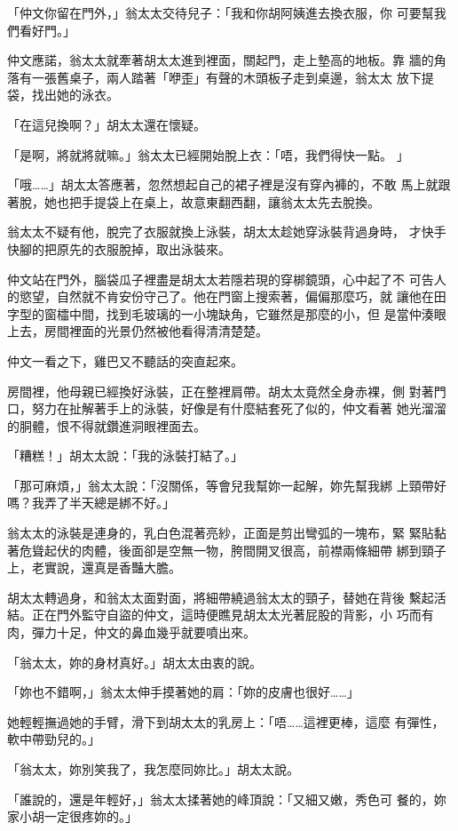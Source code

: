 「仲文你留在門外，」翁太太交待兒子：「我和你胡阿姨進去換衣服，你
可要幫我們看好門。」

仲文應諾，翁太太就牽著胡太太進到裡面，關起門，走上墊高的地板。靠
牆的角落有一張舊桌子，兩人踏著「咿歪」有聲的木頭板子走到桌邊，翁太太
放下提袋，找出她的泳衣。

「在這兒換啊？」胡太太還在懷疑。

「是啊，將就將就嘛。」翁太太已經開始脫上衣：「唔，我們得快一點。
」

「哦……」胡太太答應著，忽然想起自己的裙子裡是沒有穿內褲的，不敢
馬上就跟著脫，她也把手提袋上在桌上，故意東翻西翻，讓翁太太先去脫換。

翁太太不疑有他，脫完了衣服就換上泳裝，胡太太趁她穿泳裝背過身時，
才快手快腳的把原先的衣服脫掉，取出泳裝來。

仲文站在門外，腦袋瓜子裡盡是胡太太若隱若現的穿梆鏡頭，心中起了不
可告人的慾望，自然就不肯安份守己了。他在門窗上搜索著，偏偏那麼巧，就
讓他在田字型的窗櫺中間，找到毛玻璃的一小塊缺角，它雖然是那麼的小，但
是當仲湊眼上去，房間裡面的光景仍然被他看得清清楚楚。

仲文一看之下，雞巴又不聽話的突直起來。

房間裡，他母親已經換好泳裝，正在整裡肩帶。胡太太竟然全身赤裸，側
對著門口，努力在扯解著手上的泳裝，好像是有什麼結套死了似的，仲文看著
她光溜溜的胴體，恨不得就鑽進洞眼裡面去。

「糟糕！」胡太太說：「我的泳裝打結了。」

「那可麻煩，」翁太太說：「沒關係，等會兒我幫妳一起解，妳先幫我綁
上頸帶好嗎？我弄了半天總是綁不好。」

翁太太的泳裝是連身的，乳白色混著亮紗，正面是剪出彎弧的一塊布，緊
緊貼黏著危聳起伏的肉體，後面卻是空無一物，胯間開叉很高，前襟兩條細帶
綁到頸子上，老實說，還真是香豔大膽。

胡太太轉過身，和翁太太面對面，將細帶繞過翁太太的頸子，替她在背後
繫起活結。正在門外監守自盜的仲文，這時便瞧見胡太太光著屁股的背影，小
巧而有肉，彈力十足，仲文的鼻血幾乎就要噴出來。

「翁太太，妳的身材真好。」胡太太由衷的說。

「妳也不錯啊，」翁太太伸手摸著她的肩：「妳的皮膚也很好……」

她輕輕撫過她的手臂，滑下到胡太太的乳房上：「唔……這裡更棒，這麼
有彈性，軟中帶勁兒的。」

「翁太太，妳別笑我了，我怎麼同妳比。」胡太太說。

「誰說的，還是年輕好，」翁太太揉著她的峰頂說：「又細又嫩，秀色可
餐的，妳家小胡一定很疼妳的。」

